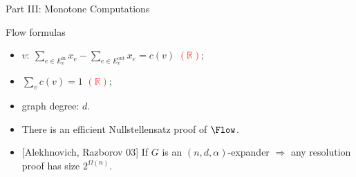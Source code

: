 \begin{frame}

    \begin{center}
        \Huge Part III: Monotone Computations
    \end{center}
    
\end{frame}

\begin{frame}{Flow formulas}
    \begin{minipage}{0.5 \linewidth}
        
    \end{minipage}%
    \begin{minipage}{0.5 \linewidth}
        \pause
        \pause
        \begin{itemize}
            \item $v\colon ~ \sum\limits_{e \in E^{\mathrm{in}}_v} x_{e} -
                \sum\limits_{e \in E^{\mathrm{out}}_v} x_{e} = c(v)$ 
                \textcolor{red}{$(\mathbb{R})$};
            \item $\sum\limits_{v} c(v) = 1$ \textcolor{red}{$(\mathbb{R})$};
            \item graph degree: $d$.
        \end{itemize}
    \end{minipage}

    \pause
    \vspace{0.2cm}
    \begin{itemize}
        \item{} There is an efficient Nullstellensatz proof of $\Flow$.
        \item{} [Alekhnovich, Razborov 03] If $G$ is an $(n, d, \alpha)$-expander $\Rightarrow$ any
            resolution proof has size $2^{\Omega(n)}$.
    \end{itemize}


\end{frame}
